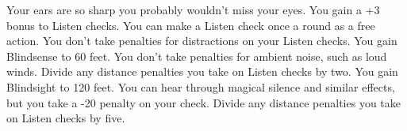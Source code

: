 {Your ears are so sharp you probably wouldn't miss your eyes.}
{You gain a +3 bonus to Listen checks.}
{You can make a Listen check once a round as a free action. You don't take penalties for distractions on your Listen checks.}
{You gain Blindsense to 60 feet. You don't take penalties for ambient noise, such as loud winds. Divide any distance penalties you take on Listen checks by two.}
{You gain Blindsight to 120 feet.}
{You can hear through magical silence and similar effects, but you take a -20 penalty on your check. Divide any distance penalties you take on Listen checks by five.}